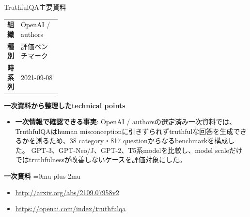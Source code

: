 \begin{technicalnote}{TruthfulQA}{主要資料}
\begingroup
\begin{tabularx}{\linewidth}{@{}>{\bfseries}p{0.22\linewidth}X@{}}
組織 & OpenAI / authors \\
種別 & 評価ベンチマーク \\
時系列 & 2021-09-08 \\
\end{tabularx}
\smallskip
\begin{minipage}{\linewidth}
{\bfseries 一次資料から整理したtechnical points}
\begin{itemize}[leftmargin=1.5em,itemsep=0.35em]
\item \textbf{一次情報で確認できる事実}: OpenAI / authorsの選定済み一次資料では、TruthfulQAはhuman misconceptionに引きずられずtruthfulな回答を生成できるかを測るため、38 category・817 questionからなるbenchmarkを構成した。 GPT-3、GPT-Neo/J、GPT-2、T5系modelを比較し、model scaleだけではtruthfulnessが改善しないケースを評価対象にした。
\end{itemize}
\begin{minipage}{\linewidth}
\begin{samepage}
{\bfseries 一次資料}
\begingroup\sloppy
\Urlmuskip=0mu plus 2mu\relax
\begin{itemize}[leftmargin=1.5em,itemsep=0.25em]
\item {\scriptsize\url{http://arxiv.org/abs/2109.07958v2}}
\item {\scriptsize\url{https://openai.com/index/truthfulqa}}
\end{itemize}
\endgroup
\end{samepage}
\end{minipage}
\end{minipage}
\endgroup
\end{technicalnote}
\medskip

